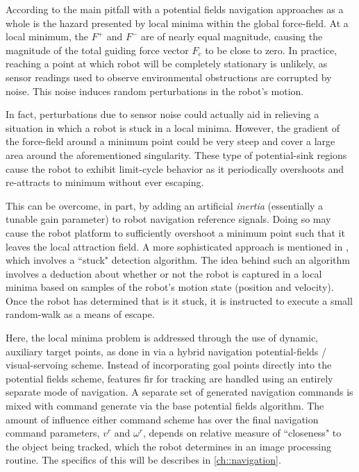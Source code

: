 		According to \cite{Koren1991} the main pitfall with a potential fields navigation approaches as a whole is the hazard presented by local minima within the global force-field. At a local minimum, the $F^{+}$ and $F^{-}$ are of nearly equal magnitude, causing the magnitude of the total guiding force vector $F_{c}$ to be close to zero. In practice, reaching a point at which robot will be completely stationary is unlikely, as sensor readings used to observe environmental obstructions are corrupted by noise. This noise induces random perturbations in the robot's motion.

		In fact, perturbations due to sensor noise could actually aid in relieving a situation in which a robot is stuck in a local minima. However, the gradient of the force-field around a minimum point could be very steep and cover a large area around the aforementioned singularity. These type of potential-sink regions cause the robot to exhibit limit-cycle behavior as it periodically overshoots and re-attracts to minimum without ever escaping. 

		This can be overcome, in part, by adding an artificial \emph{inertia} (essentially a tunable gain parameter) to robot navigation reference signals. Doing so may cause the robot platform to sufficiently overshoot a minimum point such that it leaves the local attraction field. A more sophisticated approach is mentioned in \cite{Krishnamurthy2007}, which involves a ``stuck" detection algorithm. The idea behind such an algorithm involves a deduction about whether or not the robot is captured in a local minima based on samples of the robot’s motion state (\IE position and velocity). Once the robot has determined that is it stuck, it is instructed to execute a small random-walk as a means of escape. 

		Here, the local minima problem is addressed through the use of dynamic, auxiliary target points, as done in \cite{ArambulaCosio2004} via a hybrid navigation potential-fields / visual-servoing scheme. Instead of incorporating goal points directly into the potential fields scheme, features fir for tracking are handled using an entirely separate mode of navigation. A separate set of generated navigation commands is mixed with command generate via the base potential fields algorithm. The amount of influence either command scheme has over the final navigation command parameters, $v^{r}$ and $\omega^{r}$, depends on relative measure of ``closeness" to the object being tracked, which the robot determines in an image processing routine. The specifics of this will be describes in \ref{ch::navigation}. 

